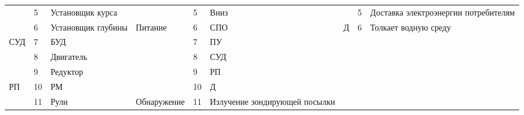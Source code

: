 \begin{landscape}
\begin{longtable}[c]{llm{}||l|l|m{}||llm{}}
\multicolumn{1}{|l|}{}                     & \multicolumn{1}{l|}{5}          & Установщик курса                            &                                   & 5                               & Вниз                             & \multicolumn{1}{l|}{}                     & \multicolumn{1}{l|}{5}          & \multicolumn{1}{p{.25\textwidth}|}{Доставка электроэнергии потребителям} \\ \cline{2-9} 
\multicolumn{1}{|l|}{}                     & \multicolumn{1}{l|}{6}          & Установщик глубины                          & \multirow{5}{*}{Питание}          & 6                               & СПО                              & \multicolumn{1}{l|}{Д}                    & \multicolumn{1}{l|}{6}          & \multicolumn{1}{l|}{Толкает водную среду}                 \\ \cline{1-3} \cline{5-9} 
\multicolumn{1}{|l|}{\multirow{3}{*}{СУД}} & \multicolumn{1}{l|}{7}          & БУД                                         &                                   & 7                               & ПУ                               &                                           &                                 &                                                           \\ \cline{2-3} \cline{5-6}
\multicolumn{1}{|l|}{}                     & \multicolumn{1}{l|}{8}          & Двигатель                                   &                                   & 8                               & СУД                              &                                           &                                 &                                                           \\ \cline{2-3} \cline{5-6}
\multicolumn{1}{|l|}{}                     & \multicolumn{1}{l|}{9}          & Редуктор                                    &                                   & 9                               & РП                               &                                           &                                 &                                                           \\ \cline{1-3} \cline{5-6}
\multicolumn{1}{|l|}{\multirow{2}{*}{РП}}  & \multicolumn{1}{l|}{10}         & РМ                                          &                                   & 10                              & Д                                &                                           &                                 &                                                           \\ \cline{2-6}
\multicolumn{1}{|l|}{}                     & \multicolumn{1}{l|}{11}         & Рули                                        & \multirow{2}{*}{Обнаружение}      & 11                              & Излучение зондирующей посылки    &                                           &                                 &                                                           \\ \cline{1-3} \cline{5-6}

\end{longtable}
\end{landscape}
